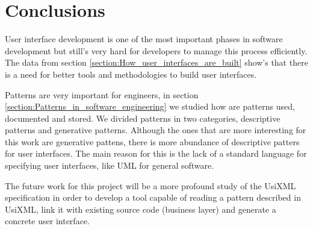 \section{Conclusions}
User interface development is one of the most important phases in software development but still's very hard for developers to manage this process efficiently. The data from section \ref{section:How_user_interfaces_are_built} show's that there is a need for better tools and methodologies to build user interfaces.

Patterns are very important for engineers, in section \ref{section:Patterns_in_software_engineering} we studied how are patterns used, documented and stored. We divided patterns in two categories, descriptive patterns and generative patterns. Although the ones that are more interesting for this work are generative pattens, there is more abundance of descriptive patters for user interfaces. The main reason for this is the lack of a standard language for specifying user interfaces, like UML for general software.

The future work for this project will be a more profound study of the UsiXML specification in order to develop a tool capable of reading a pattern described in UsiXML, link it with existing source code (business layer) and generate a concrete user interface.